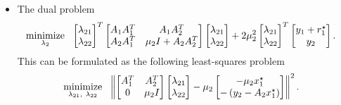 \documentclass[12pt]{article}
\begin{document}
\begin{itemize}
\item The dual problem
%
\begin{align}
\mathop{\mbox{minimize}}_{\lambda_{2}} \ \  &
\begin{bmatrix} \lambda_{21} \\ \lambda_{22} \end{bmatrix}^T
\begin{bmatrix} A_1A_1^T & A_1A_2^T \\ A_2A_1^T & \mu_2 I+A_2A_2^T \end{bmatrix}
\begin{bmatrix} \lambda_{21} \\ \lambda_{22} \end{bmatrix} +
2\mu_2^2
\begin{bmatrix} \lambda_{21} \\ \lambda_{22} \end{bmatrix}^T \begin{bmatrix} y_1+r_1^{\star} \\ y_2 \end{bmatrix}.
\end{align}
%
This can be formulated as the following least-squares problem
%
\begin{align}
  \mathop{\mbox{minimize}}_{\lambda_{21},\ \lambda_{22}} \ \  & \left\lVert\begin{bmatrix}A_1^T & A_2^T \\ 0 & \mu_2I \end{bmatrix}
    \begin{bmatrix} \lambda_{21} \\ \lambda_{22} \end{bmatrix} -
    \mu_2\begin{bmatrix} -\mu_2 x_1^{\star} \\ -\left(y_2 - A_2x_1^{\star}\right) \end{bmatrix}\right\rVert^2.
\end{align}

\end{itemize}
\end{document}
